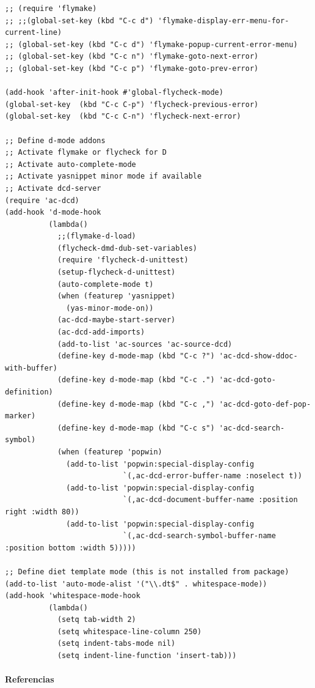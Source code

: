\documentclass[12pt,spanish,]{scrartcl}
\let\oldparagraph\paragraph
\renewcommand{\paragraph}[1]{\oldparagraph{#1}\mbox{}}
\begin{document}
\begin{verbatim}
;; (require 'flymake)
;; ;;(global-set-key (kbd "C-c d") 'flymake-display-err-menu-for-current-line)
;; (global-set-key (kbd "C-c d") 'flymake-popup-current-error-menu)
;; (global-set-key (kbd "C-c n") 'flymake-goto-next-error)
;; (global-set-key (kbd "C-c p") 'flymake-goto-prev-error)

(add-hook 'after-init-hook #'global-flycheck-mode)
(global-set-key  (kbd "C-c C-p") 'flycheck-previous-error)
(global-set-key  (kbd "C-c C-n") 'flycheck-next-error)

;; Define d-mode addons
;; Activate flymake or flycheck for D
;; Activate auto-complete-mode
;; Activate yasnippet minor mode if available
;; Activate dcd-server
(require 'ac-dcd)
(add-hook 'd-mode-hook
          (lambda()
            ;;(flymake-d-load)
            (flycheck-dmd-dub-set-variables)
            (require 'flycheck-d-unittest)
            (setup-flycheck-d-unittest)
            (auto-complete-mode t)
            (when (featurep 'yasnippet)
              (yas-minor-mode-on))
            (ac-dcd-maybe-start-server)
            (ac-dcd-add-imports)
            (add-to-list 'ac-sources 'ac-source-dcd)
            (define-key d-mode-map (kbd "C-c ?") 'ac-dcd-show-ddoc-with-buffer)
            (define-key d-mode-map (kbd "C-c .") 'ac-dcd-goto-definition)
            (define-key d-mode-map (kbd "C-c ,") 'ac-dcd-goto-def-pop-marker)
            (define-key d-mode-map (kbd "C-c s") 'ac-dcd-search-symbol)
            (when (featurep 'popwin)
              (add-to-list 'popwin:special-display-config
                           `(,ac-dcd-error-buffer-name :noselect t))
              (add-to-list 'popwin:special-display-config
                           `(,ac-dcd-document-buffer-name :position right :width 80))
              (add-to-list 'popwin:special-display-config
                           `(,ac-dcd-search-symbol-buffer-name :position bottom :width 5)))))

;; Define diet template mode (this is not installed from package)
(add-to-list 'auto-mode-alist '("\\.dt$" . whitespace-mode))
(add-hook 'whitespace-mode-hook
          (lambda()
            (setq tab-width 2)
            (setq whitespace-line-column 250)
            (setq indent-tabs-mode nil)
            (setq indent-line-function 'insert-tab)))
\end{verbatim}

\hypertarget{referencias}{%
\paragraph{Referencias}\label{referencias}}
\end{document}
